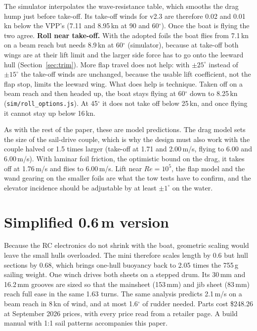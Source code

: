 \documentclass[10pt,twocolumn]{article}
\begin{document}
The simulator interpolates the wave-resistance table, which smooths the drag hump just before take-off. Its take-off winds for v2.3 are therefore 0.02 and 0.01\,kn below the VPP's (7.11 and 8.95\,kn at 90 and 60$^\circ$). Once the boat is flying the two agree. \noindent\textbf{Roll near take-off.} With the adopted foils the boat flies from 7.1\,kn on a beam reach but needs 8.9\,kn at 60$^\circ$ (simulator), because at take-off both wings are at their lift limit and the larger side force has to go onto the leeward hull (Section~\ref{sec:trim}). More flap travel does not help: with $\pm25^\circ$ instead of $\pm15^\circ$ the take-off winds are unchanged, because the usable lift coefficient, not the flap stop, limits the leeward wing. What does help is technique. Taken off on a beam reach and then headed up, the boat stays flying at 60$^\circ$ down to 8.25\,kn (\texttt{sim/roll\_options.js}). At 45$^\circ$ it does not take off below 25\,kn, and once flying it cannot stay up below 16\,kn.

As with the rest of the paper, these are model predictions. The drag model sets the size of the sail-drive couple, which is why the design must also work with the couple halved or 1.5 times larger (take-off at 1.71 and 2.00\,m/s, flying to 6.00 and 6.00\,m/s). With laminar foil friction, the optimistic bound on the drag, it takes off at 1.76\,m/s and flies to 6.00\,m/s. Lift near $Re=10^5$, the flap model and the wand gearing on the smaller foils are what the tow tests have to confirm, and the elevator incidence should be adjustable by at least $\pm1^\circ$ on the water.


\section{Simplified 0.6\,m version}
Because the RC electronics do not shrink with the boat, geometric scaling would leave the small hulls overloaded. The mini therefore scales length by 0.6 but hull sections by 0.68, which brings one-hull buoyancy back to 2.05 times the 755\,g sailing weight. One winch drives both sheets on a stepped drum. Its 30\,mm and 16.2\,mm grooves are sized so that the mainsheet (153\,mm) and jib sheet (83\,mm) reach full ease in the same 1.63 turns. The same analysis predicts 2.1\,m/s on a beam reach in 8\,kn of wind, and at most 1.6$^\circ$ of rudder needed. Parts cost \$248.26 at September 2026 prices, with every price read from a retailer page. A build manual with 1:1 sail patterns accompanies this paper.
\end{document}
